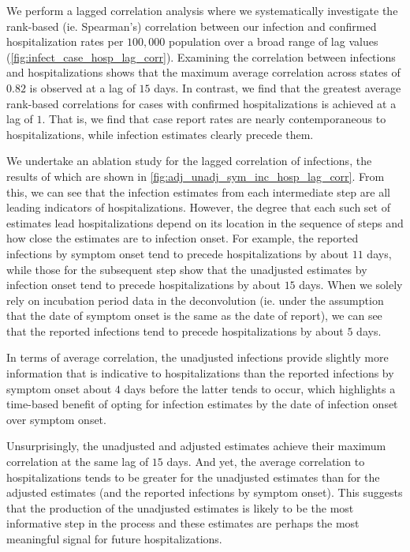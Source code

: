 \documentclass{article}
\begin{document}
We perform a lagged correlation analysis where we systematically investigate the
rank-based (ie. Spearman's) correlation between our infection and confirmed
hospitalization rates per $100,000$ population over a broad range of lag values
(\autoref{fig:infect_case_hosp_lag_corr}). Examining the correlation between infections and
hospitalizations shows that the maximum average correlation across states of $0.82$ is 
observed at a lag of $15$ days. In contrast, we find that the greatest average
rank-based correlations for cases with confirmed hospitalizations is achieved at a lag of
$1$. That is, we find that case report rates are nearly contemporaneous to
hospitalizations, while infection estimates clearly precede them. 

We undertake an ablation study for the lagged correlation of infections, the results of which 
are shown in \autoref{fig:adj_unadj_sym_inc_hosp_lag_corr}. From this, we can see that the 
infection estimates from each intermediate 
step are all leading indicators of hospitalizations. However, the degree that each such set of estimates
lead hospitalizations depend on its location in the sequence of steps and how close the estimates 
are to infection onset. For example, 
 the reported infections by symptom onset tend to precede hospitalizations by about $11$
days, while those for the subsequent step show that the unadjusted estimates by infection onset
tend to precede hospitalizations by about $15$ days. When we solely rely on incubation period data 
in the deconvolution (ie. under the assumption that the date of symptom
onset is the same as the date of report), we can see that the reported infections tend to precede
hospitalizations by about $5$ days. 

In terms of average correlation, the unadjusted infections provide slightly more
information that is indicative to hospitalizations than the reported infections by symptom onset
about $4$ days before the latter tends to occur, which highlights a time-based benefit of opting for
infection estimates by the date of infection onset over symptom onset. 

Unsurprisingly, the unadjusted and adjusted estimates achieve their maximum correlation
at the same lag of $15$ days. And yet, the average correlation to hospitalizations
tends to be greater for the unadjusted estimates than for the adjusted estimates (and
the reported infections by symptom onset). This suggests that the production of the
unadjusted estimates is likely to be the most informative step in the process and
these estimates are perhaps the most meaningful signal for future hospitalizations.
\end{document}
